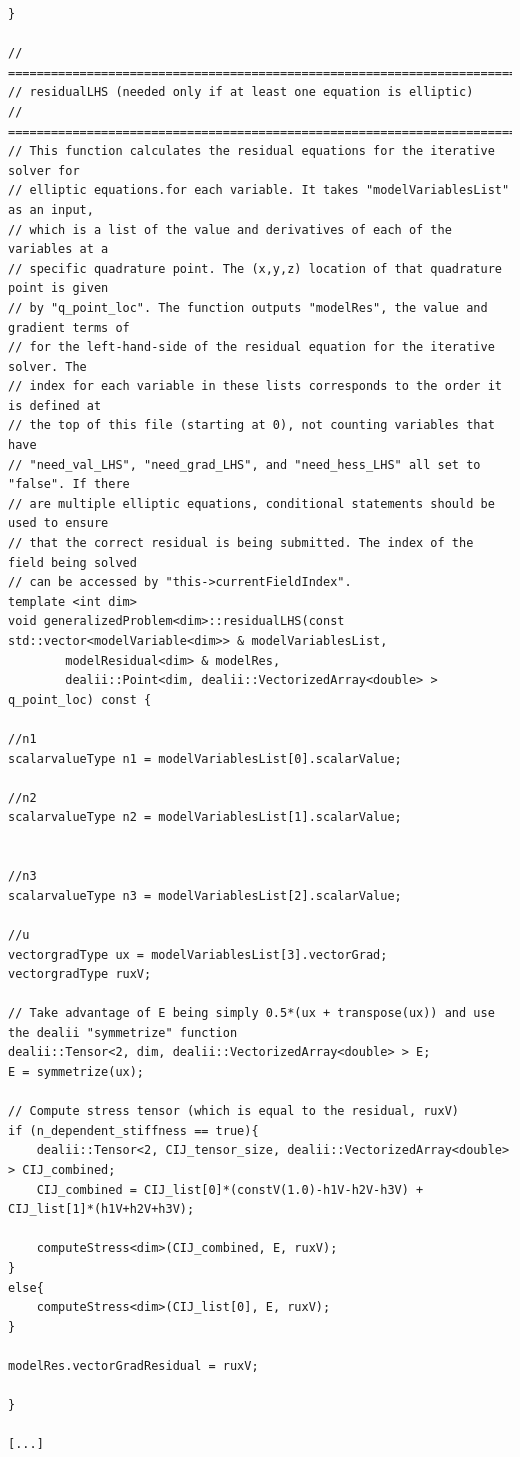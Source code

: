 \documentclass[10pt]{article} %
\begin{document}
\begin{lstlisting}
}

// =================================================================================
// residualLHS (needed only if at least one equation is elliptic)
// =================================================================================
// This function calculates the residual equations for the iterative solver for
// elliptic equations.for each variable. It takes "modelVariablesList" as an input,
// which is a list of the value and derivatives of each of the variables at a
// specific quadrature point. The (x,y,z) location of that quadrature point is given
// by "q_point_loc". The function outputs "modelRes", the value and gradient terms of
// for the left-hand-side of the residual equation for the iterative solver. The
// index for each variable in these lists corresponds to the order it is defined at
// the top of this file (starting at 0), not counting variables that have
// "need_val_LHS", "need_grad_LHS", and "need_hess_LHS" all set to "false". If there
// are multiple elliptic equations, conditional statements should be used to ensure
// that the correct residual is being submitted. The index of the field being solved
// can be accessed by "this->currentFieldIndex".
template <int dim>
void generalizedProblem<dim>::residualLHS(const std::vector<modelVariable<dim>> & modelVariablesList,
		modelResidual<dim> & modelRes,
		dealii::Point<dim, dealii::VectorizedArray<double> > q_point_loc) const {

//n1
scalarvalueType n1 = modelVariablesList[0].scalarValue;

//n2
scalarvalueType n2 = modelVariablesList[1].scalarValue;


//n3
scalarvalueType n3 = modelVariablesList[2].scalarValue;

//u
vectorgradType ux = modelVariablesList[3].vectorGrad;
vectorgradType ruxV;

// Take advantage of E being simply 0.5*(ux + transpose(ux)) and use the dealii "symmetrize" function
dealii::Tensor<2, dim, dealii::VectorizedArray<double> > E;
E = symmetrize(ux); 

// Compute stress tensor (which is equal to the residual, ruxV)
if (n_dependent_stiffness == true){
	dealii::Tensor<2, CIJ_tensor_size, dealii::VectorizedArray<double> > CIJ_combined;
	CIJ_combined = CIJ_list[0]*(constV(1.0)-h1V-h2V-h3V) + CIJ_list[1]*(h1V+h2V+h3V);

	computeStress<dim>(CIJ_combined, E, ruxV);
}
else{
	computeStress<dim>(CIJ_list[0], E, ruxV);
}

modelRes.vectorGradResidual = ruxV;

}

[...]
\end{lstlisting} \normalsize
\end{document}
